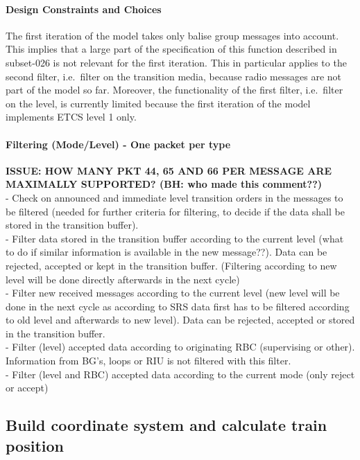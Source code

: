 \documentclass{template/openetcs_report}
\begin{document}
\paragraph{Design Constraints and Choices}
The first iteration of the model takes only balise group messages into account. This implies that a large part of the specification of this function described in subset-026 \cite{subset-026} is not relevant for the first iteration. This in particular applies to the second filter, i.e.~filter on the transition media, because radio messages are not part of the model so far. Moreover, the functionality of the first filter, i.e.~filter on the level, is currently  limited because the first iteration of the model implements ETCS level 1 only.

\paragraph{Filtering (Mode/Level) - One packet per type}
\textbf{ISSUE: HOW MANY PKT 44, 65 AND 66 PER MESSAGE ARE MAXIMALLY SUPPORTED? (BH: who made this comment??)}\\

- Check on announced and immediate level transition orders in the messages to be filtered (needed for further criteria for filtering, to decide if the data shall be stored in the transition buffer).\\
- Filter data stored in the transition buffer according to the current level (what to do if similar information is available in the new message??). Data can be rejected, accepted or kept in the transition buffer.
(Filtering according to new level will be done directly afterwards in the next cycle)\\
- Filter new received messages according to the current level (new level will be done in the next cycle as according to \gls{SRS} data first has to be filtered according to old level and afterwards to new level). Data can be rejected, accepted or stored in the transition buffer.\\
- Filter (level) accepted data according to originating RBC (supervising or other). Information from \gls{BG}'s, loops or RIU is not filtered with this filter.\\
- Filter (level and RBC) accepted data according to the current mode (only reject or accept)\\



\subsection{Build coordinate system and calculate train position}
\end{document}
